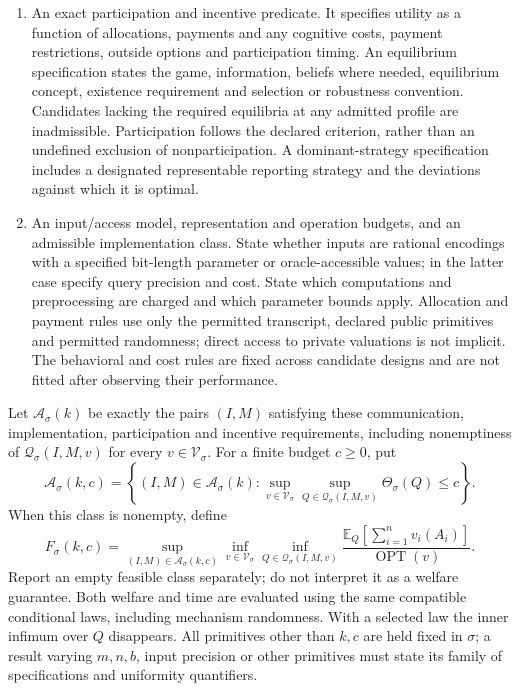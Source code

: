 \documentclass[11pt,a4paper]{article}
\begin{document}
\begin{enumerate}
\item An exact participation and incentive predicate. It specifies utility as a function of allocations, payments and any cognitive costs, payment restrictions, outside options and participation timing. An equilibrium specification states the game, information, beliefs where needed, equilibrium concept, existence requirement and selection or robustness convention. Candidates lacking the required equilibria at any admitted profile are inadmissible. Participation follows the declared criterion, rather than an undefined exclusion of nonparticipation. A dominant-strategy specification includes a designated representable reporting strategy and the deviations against which it is optimal.
\item An input/access model, representation and operation budgets, and an admissible implementation class. State whether inputs are rational encodings with a specified bit-length parameter or oracle-accessible values; in the latter case specify query precision and cost. State which computations and preprocessing are charged and which parameter bounds apply. Allocation and payment rules use only the permitted transcript, declared public primitives and permitted randomness; direct access to private valuations is not implicit. The behavioral and cost rules are fixed across candidate designs and are not fitted after observing their performance.
\end{enumerate}
Let \(\mathscr A_\sigma(k)\) be exactly the pairs \((I,M)\) satisfying these communication, implementation, participation and incentive requirements, including nonemptiness of \(\mathcal Q_\sigma(I,M,v)\) for every \(v\in\mathcal V_\sigma\). For a finite budget \(c\geq0\), put
\[
 \mathscr A_\sigma(k,c)=\left\{(I,M)\in\mathscr A_\sigma(k):
 \sup_{v\in\mathcal V_\sigma}\sup_{Q\in\mathcal Q_\sigma(I,M,v)}\Theta_\sigma(Q)\leq c\right\}.
\]
When this class is nonempty, define
\[
 F_\sigma(k,c)=\sup_{(I,M)\in\mathscr A_\sigma(k,c)}
 \inf_{v\in\mathcal V_\sigma}\inf_{Q\in\mathcal Q_\sigma(I,M,v)}
 \frac{\mathbb E_Q[\sum_{i=1}^n v_i(A_i)]}{\operatorname{OPT}(v)}.
\]
Report an empty feasible class separately; do not interpret it as a welfare guarantee. Both welfare and time are evaluated using the same compatible conditional laws, including mechanism randomness. With a selected law the inner infimum over \(Q\) disappears. All primitives other than \(k,c\) are held fixed in \(\sigma\); a result varying \(m,n,b\), input precision or other primitives must state its family of specifications and uniformity quantifiers.
\end{document}
